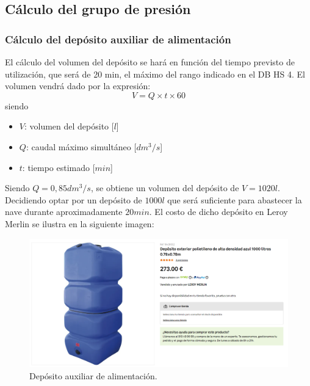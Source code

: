 \documentclass[../main.tex]{subfiles}
\begin{document}
\subsection{Cálculo del grupo de presión}
\subsubsection{Cálculo del depósito auxiliar de alimentación}
El cálculo del volumen del depósito se hará en función del tiempo previsto de utilización, que será de 20 min, el máximo del rango indicado en el DB HS 4. El volumen vendrá dado por la expresión:
\[V = Q \times t \times 60\]
siendo
\begin{itemize}
    \item $V$: volumen del depósito [$l$]
    \item $Q$: caudal máximo simultáneo [$dm^3/s$]
    \item $t$: tiempo estimado [$min$]
\end{itemize}
Siendo $Q = 0,85 dm^3/s$, se obtiene un volumen del depósito de $V = 1020 l$. Decidiendo optar por un depósito de $1000 l$ que será suficiente para abastecer la nave durante aproximadamente $20 min$. El costo de dicho depósito en Leroy Merlin se ilustra en la siguiente imagen:

\begin{figure}[H]
    \centering
    \includegraphics[width=0.5\linewidth]{Imagenes/DepositoAuxiliarAgua.png}
    \caption{Depósito auxiliar de alimentación.}
\end{figure}
\end{document}
